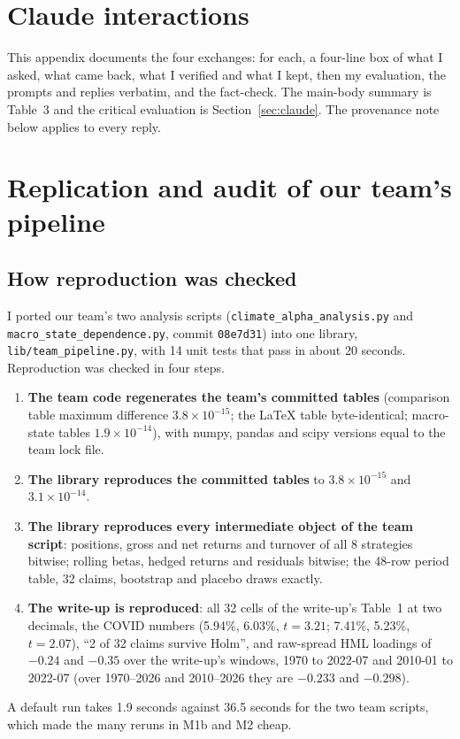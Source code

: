 \clearpage
\appendix
{}
\renewcommand{\runningtitle}{Read the Label: Appendices}

\section{Claude interactions}
\label{app:claude}

This appendix documents the four exchanges: for each, a four-line box of what I asked, what came back, what I verified and what I kept, then my evaluation, the prompts and replies verbatim, and the fact-check. The main-body summary is Table~3 and the critical evaluation is Section~\ref{sec:claude}. The provenance note below applies to every reply.



\clearpage
\section{Replication and audit of our team's pipeline}
\label{app:replication}

\subsection{How reproduction was checked}
I ported our team's two analysis scripts (\texttt{climate\_alpha\_\allowbreak analysis.py} and \texttt{macro\_state\_\allowbreak dependence.py}, commit \texttt{08e7d31}) into one library, \texttt{lib/\allowbreak team\_pipeline.py}, with 14 unit tests that pass in about 20 seconds. Reproduction was checked in four steps.
\begin{enumerate}
\item \textbf{The team code regenerates the team's committed tables} (comparison table maximum difference $3.8\times10^{-15}$; the \LaTeX{} table byte-identical; macro-state tables $1.9\times10^{-14}$), with numpy, pandas and scipy versions equal to the team lock file.
\item \textbf{The library reproduces the committed tables} to $3.8\times10^{-15}$ and $3.1\times10^{-14}$.
\item \textbf{The library reproduces every intermediate object of the team script}: positions, gross and net returns and turnover of all 8 strategies bitwise; rolling betas, hedged returns and residuals bitwise; the 48-row period table, 32 claims, bootstrap and placebo draws exactly.
\item \textbf{The write-up is reproduced}: all 32 cells of the write-up's Table~1 at two decimals, the COVID numbers (5.94\%, 6.03\%, $t=3.21$; 7.41\%, 5.23\%, $t=2.07$), ``2 of 32 claims survive Holm'', and raw-spread HML loadings of $-0.24$ and $-0.35$ over the write-up's windows, 1970 to 2022-07 and 2010-01 to 2022-07 (over 1970--2026 and 2010--2026 they are $-0.233$ and $-0.298$).
\end{enumerate}
A default run takes 1.9 seconds against 36.5 seconds for the two team scripts, which made the many reruns in M1b and M2 cheap.

